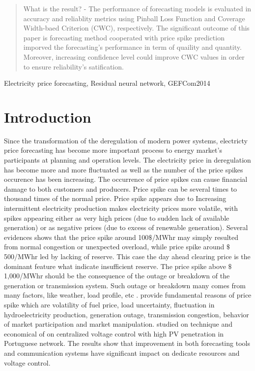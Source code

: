 \documentclass[review]{elsarticle}
\begin{document}
\begin{frontmatter}
\begin{abstract}
What is the result? - The performance of forecasting models is evaluated in accuracy and reliablity metrics using Pinball Loss Function and Coverage Width-baed Criterion (CWC), respectively. The significant outcome of this paper is forecasting method cooperated with price spike prediction imporved the forecasting's performance in term of quaility and quantity. Moreover, increasing confidence level could improve CWC values in order to ensure reliability's satification.

\end{abstract}

\begin{keyword}
Electricity price forecasting, Residual neural network, GEFCom2014
\end{keyword}

\end{frontmatter}

\linenumbers

\section{Introduction}

  Since the transformation of the deregulation of modern power systems, electricty price forecasting has become more important process to energy market's participants at planning and operation levels. The electricity price in deregulation has become more and more fluctuated as well as the number of the price spikes occurence has been increasing. The occurrence of price spikes can cause financial damage to both customers and producers. Price spike can be several times to thousand times of the normal price. Price spike appears due to Increasing intermittent electricity production makes electricity prices more volatile, with spikes appearing either as very high prices (due to sudden lack of available generation) or as negative prices (due to excess of renewable generation). Several evidences shows that the price spike around 100$\$$/MWhr may simply resulted from normal congestion or unexpected overload, while price spike around $\$$500/MWhr led by lacking of reserve. This case the day ahead clearing price is the dominant feature what indicate insufficient reserve. The price spike above $\$$1,000/MWhr should be the consequence of the outage or breakdown of the generation or transmission system. Such outage or breakdown many comes from many factors, like weather, load profile, etc  \cite{He2016}. \cite{SINGHAL2011550} provide fundamental reasons of price spike which are volatility of fuel price, load uncertainty, fluctuation in hydroelectricity production, generation outage, transmission congestion, behavior of market participation and market manipulation. \cite{GONZALEZSOTRES2017338} studied on technique and economical of on centralized voltage control with high PV penetration in Portuguese network. The results show that improvement in both forecasting tools and communication systems have significant impact on dedicate resources and voltage control.
\end{document}

